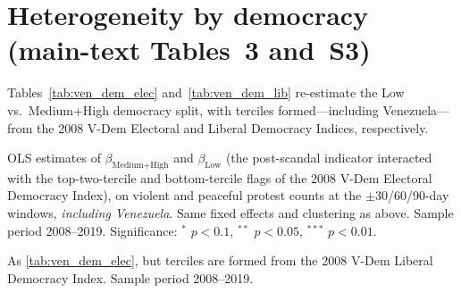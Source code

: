 \documentclass[11pt]{article}
\begin{document}
\section{Heterogeneity by democracy (main-text Tables~3 and~S3)}

Tables~\ref{tab:ven_dem_elec} and~\ref{tab:ven_dem_lib} re-estimate the Low vs.\ Medium+High democracy split, with terciles formed---including Venezuela---from the 2008 V-Dem Electoral and Liberal Democracy Indices, respectively.

\begin{table}[htb!]
    \caption{Effect by 2008 level of democracy (Electoral index), Venezuela included.}
    \label{tab:ven_dem_elec}
    \begin{center}\scriptsize{}\end{center}
    \footnotesize{OLS estimates of $\beta_{\text{Medium+High}}$ and $\beta_{\text{Low}}$ (the post-scandal indicator interacted with the top-two-tercile and bottom-tercile flags of the 2008 V-Dem Electoral Democracy Index), on violent and peaceful protest counts at the $\pm$30/60/90-day windows, \emph{including Venezuela}. Same fixed effects and clustering as above. Sample period 2008--2019. Significance: $^{*}$ $p<0.1$, $^{**}$ $p<0.05$, $^{***}$ $p<0.01$.}
\end{table}

\begin{table}[htb!]
    \caption{Effect by 2008 level of democracy (Liberal index), Venezuela included.}
    \label{tab:ven_dem_lib}
    \begin{center}\scriptsize{}\end{center}
    \footnotesize{As \autoref{tab:ven_dem_elec}, but terciles are formed from the 2008 V-Dem Liberal Democracy Index. Sample period 2008--2019.}
\end{table}
\end{document}
